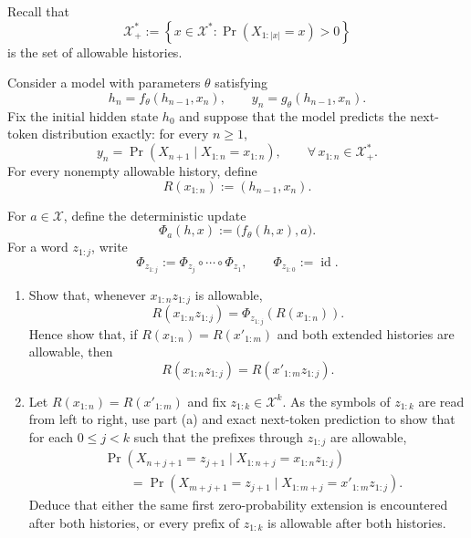 \begin{exercise}
\label{ex:p2-4}
  Recall that
  \[
    \mathcal X_+^*
      :=\left\{x\in\mathcal X^*:
        \Pr\!\left(X_{1:|x|}=x\right)>0\right\}
  \]
  is the set of allowable histories.

  Consider a model with parameters $\theta$ satisfying
  \[
    h_n=f_\theta(h_{n-1},x_n),
    \qquad
    y_n=g_\theta(h_{n-1},x_n).
  \]
  Fix the initial hidden state $h_0$ and suppose that the model predicts the
  next-token distribution exactly: for every $n\geq1$,
  \[
    y_n
      =\Pr\!\left(
        X_{n+1}\mid X_{1:n}=x_{1:n}
      \right),
      \qquad \forall\,x_{1:n}\in\mathcal X_+^*.
  \]
  For every nonempty allowable history, define
  \[
    R(x_{1:n}):=(h_{n-1},x_n).
  \]

  For $a\in\mathcal X$, define the deterministic update
  \[
    \Phi_a(h,x):=\bigl(f_\theta(h,x),a\bigr).
  \]
  For a word $z_{1:j}$, write
  \[
    \Phi_{z_{1:j}}
      :=\Phi_{z_j}\circ\cdots\circ\Phi_{z_1},
    \qquad
    \Phi_{z_{1:0}}:=\operatorname{id}.
  \]

  \begin{enumerate}
    \item Show that, whenever $x_{1:n}z_{1:j}$ is allowable,
      \[
        R(x_{1:n}z_{1:j})
          =\Phi_{z_{1:j}}\!\left(R(x_{1:n})\right).
      \]
      Hence show that, if $R(x_{1:n})=R(x'_{1:m})$ and both extended
      histories are allowable, then
      \[
        R(x_{1:n}z_{1:j})=R(x'_{1:m}z_{1:j}).
      \]

    \item Let $R(x_{1:n})=R(x'_{1:m})$ and fix
      $z_{1:k}\in\mathcal X^k$. As the symbols of $z_{1:k}$ are read from
      left to right, use part (a) and exact next-token prediction to show that
      for each $0\leq j<k$ such that the prefixes through $z_{1:j}$ are
      allowable,
      \[
        \begin{aligned}
        &\Pr\!\left(
          X_{n+j+1}=z_{j+1}
          \mid X_{1:n+j}=x_{1:n}z_{1:j}
        \right)\\
        &\qquad=
        \Pr\!\left(
          X_{m+j+1}=z_{j+1}
          \mid X_{1:m+j}=x'_{1:m}z_{1:j}
        \right).
        \end{aligned}
      \]
      Deduce that either the same first zero-probability extension is
      encountered after both histories, or every prefix of $z_{1:k}$ is
      allowable after both histories.


\end{enumerate}
\end{exercise}
